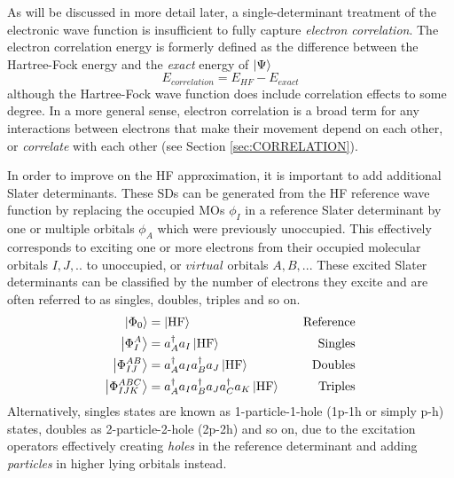 As will be discussed in more detail later, a single-determinant treatment of the electronic wave function is insufficient to fully capture \emph{electron correlation}. The electron correlation energy is formerly defined as the difference between the Hartree-Fock energy and the \emph{exact} energy of $\ket{\Psi}$
\begin{equation}
E_{correlation} = E_{HF} - E_{exact}
\end{equation}
\noindent although the Hartree-Fock wave function does include correlation effects to some degree. In a more general sense, electron correlation is a broad term for any interactions between electrons that make their movement depend on each other, or \emph{correlate} with each other (see Section \ref{sec:CORRELATION}). 

In order to improve on the HF approximation, it is important to add additional Slater determinants. These SDs can be generated from the HF reference wave function by replacing the occupied MOs $\phi_I$ in a reference Slater determinant by one or multiple orbitals $\phi_A$ which were previously unoccupied. This effectively corresponds to exciting one or more electrons from their occupied molecular orbitals $I,J,..$ to unoccupied, or $virtual$ orbitals $A,B,..$. These excited Slater determinants can be classified by the number of electrons they excite and are often referred to as singles, doubles, triples and so on.
\begin{alignat}{2}
\ket{\Phi_0} &= \ket{\text{HF}} \quad & \text{Reference} \\
\ket{\Phi_{I}^{A}} &= a^{\dagger}_A a_I \ket{\text{HF}} \quad & \text{Singles}  \\
\ket{\Phi_{IJ}^{AB}} &= a^{\dagger}_A a_I a^{\dagger}_B a_J \ket{\text{HF}} \quad & \text{Doubles} \\
\ket{\Phi_{IJK}^{ABC}} &= a^{\dagger}_A a_I a^{\dagger}_B a_J a^{\dagger}_C a_K \ket{\text{HF}} \quad & \text{Triples} 
\end{alignat}
\noindent Alternatively, singles states are known as 1-particle-1-hole (1p-1h or simply p-h) states, doubles as 2-particle-2-hole (2p-2h) and so on, due to the excitation operators effectively creating \emph{holes} in the reference determinant and adding \emph{particles} in higher lying orbitals instead. 

